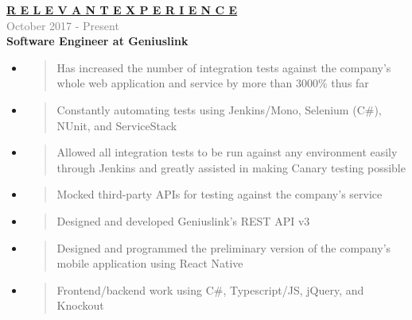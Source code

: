 \documentclass[letterpage]{article}
\begin{document}
\begin{minipage}[t]{0.63\linewidth}
\vspace{0pt}
\textbf{\fontsize{14px}{1px}\selectfont
  \ul{R E L E V A N T \:\: E X P E R I E N C E}
}\\

\vspace{7px}
\textcolor{gray}{October 2017 - Present}\\
\textbf{\textsf{Software Engineer at Geniuslink}}
\begin{itemize}[leftmargin=*,labelindent=1mm,labelsep=0mm]
\renewcommand\labelitemi{\rule[1mm]{0.33mm}{0.33mm}}
\renewcommand\labelitemii{$\blacksquare$}
\item
  \begin{quote}
  \raggedright
  Has increased the number of integration tests against the company's whole web
  application and service by more than 3000\% thus far
  \end{quote}
\item
  \begin{quote}
  \raggedright
  Constantly automating tests using Jenkins/Mono,
  Selenium (C\#), NUnit, and ServiceStack
  \end{quote}
\item
  \begin{quote}
  \raggedright
  Allowed all integration tests to be run against any
  environment easily through Jenkins and greatly
  assisted in making Canary testing possible
  \end{quote}
\item
  \begin{quote}
  \raggedright
  Mocked third-party APIs for testing against the company's service
  \end{quote}
\item
  \begin{quote}
  \raggedright
  Designed and developed Geniuslink's REST API v3
  \end{quote}
\item
  \begin{quote}
  \raggedright
  Designed and programmed the preliminary version of the company's mobile
  application using React Native
  \end{quote}
\item
  \begin{quote}
  \raggedright
  Frontend/backend work using C\#, Typescript/JS,
  jQuery, and Knockout
  \end{quote}
\end{itemize}


\end{minipage}
\end{document}

